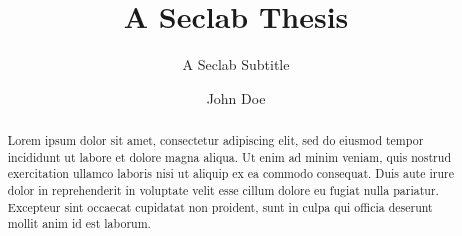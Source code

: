 \documentclass[english,master]{unibg}
\title{A Seclab Thesis}
\subtitle{A Seclab Subtitle}
\author{John Doe}
\begin{document}
\maketitle
\emptypage

\begin{abstract}
Lorem ipsum dolor sit amet, consectetur adipiscing elit, sed do eiusmod tempor
incididunt ut labore et dolore magna aliqua. Ut enim ad minim veniam, quis
nostrud exercitation ullamco laboris nisi ut aliquip ex ea commodo consequat.
Duis aute irure dolor in reprehenderit in voluptate velit esse cillum dolore eu
fugiat nulla pariatur. Excepteur sint occaecat cupidatat non proident, sunt in
culpa qui officia deserunt mollit anim id est laborum.
\end{abstract}

\emptypage
\toc
\emptypage

\clearpage
{}




\nocite{*}
\printbibliography[heading=bibintoc]
\end{document}
